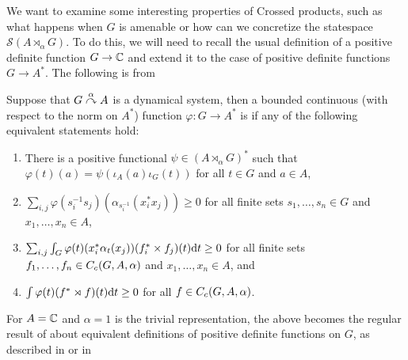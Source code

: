 We want to examine some interesting properties of Crossed products, such as what happens when $G$ is amenable or how can we concretize the statespace $\mathcal{S}(A\rtimes_\alpha G)$. To do this, we will need to recall the usual definition of a positive definite function $G \to \mathbb{C}$ and extend it to the case of positive definite functions $G \to A^*$. The following is from \cite{pedersenalgauto}

\begin{definition}
	Suppose that $G \stackrel{\alpha}{\curvearrowright} A$ is a dynamical system, then a bounded continuous (with respect to the norm on $A^*$) function $\varphi \colon G \to A^*$ is  if any of the following equivalent statements hold:
	\begin{enumerate}
		\item There is a positive functional $\psi \in (A \rtimes_\alpha G)^*$ such that $\varphi(t)(a) = \psi(\iota_A(a) \iota_G(t))$ for all $t \in G$ and $a \in A$,
		\item $\sum_{i,j} \varphi (s_i^{-1}s_j)(\alpha_{s_{i}^{-1}}(x_{i}^* x_{j})) \geq 0 $ for all finite sets $s_1,\dots,s_n \in G$ and $x_1,\dots,x_n \in A$,
		\item $\sum_{i,j}\int_G \varphi(t)(x_{i}^*\alpha_t(x_j))(f_i^* \times f_j)(t) \mathrm{d} t \geq 0$ for all finite sets $f_1,\dots,f_n \in C_c(G,A,\alpha)$ and $x_1,\dots,x_n \in A$, and
		\item $\int \varphi(t)(f^* \rtimes f)(t) \mathrm{d} t \geq 0$ for all $f \in C_c(G,A,\alpha)$.
	\end{enumerate}
\end{definition}
For $A = \mathbb{C}$ and $\alpha = 1$ is the trivial representation, the above becomes the regular result of about equivalent definitions of positive definite functions on $G$, as described in \cite{folland2016fourier} or in \cite{pedersenalgauto} 

